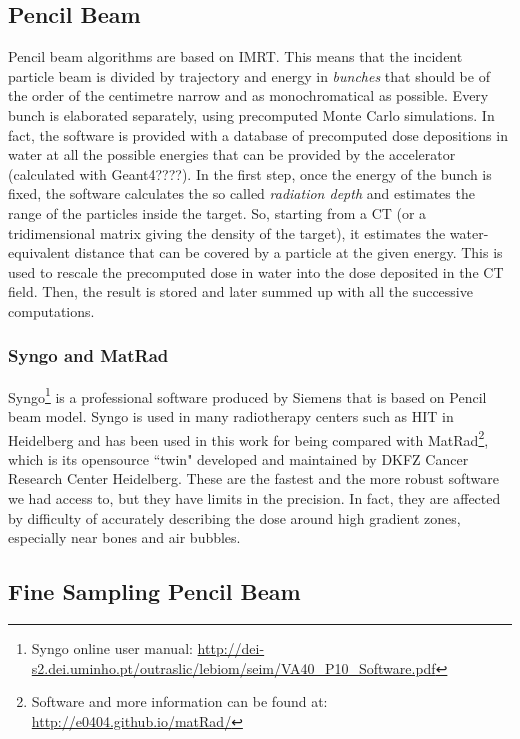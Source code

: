 \documentclass[12pt, a4paper, twoside]{book}
\begin{document}
\subsection{Pencil Beam} 
\label{sec:pen}
Pencil beam algorithms are based on IMRT. This means that the incident particle beam is divided by trajectory and energy in \emph{bunches} that should be of the order of the centimetre narrow and as monochromatical as possible. Every bunch is elaborated separately, using precomputed Monte Carlo simulations. In fact, the software is provided with a database of precomputed dose depositions in water at all the possible energies that can be provided by the accelerator (calculated with Geant4????). 
In the first step, once the energy of the bunch is fixed, the software calculates the so called \emph{radiation depth} and estimates the range of the particles inside the target. So, starting from a CT (or a tridimensional matrix giving the density of the target), it estimates the water-equivalent distance that can be covered by a particle at the given energy. 
This is used to rescale the precomputed dose in water into the dose deposited in the CT field. Then, the result is stored and later summed up with all the successive computations. 
\subsubsection{Syngo and MatRad}
Syngo\footnote{Syngo online user manual: \url{http://dei-s2.dei.uminho.pt/outraslic/lebiom/seim/VA40_P10_Software.pdf}} is a professional software produced by Siemens that is based on Pencil beam model. Syngo is used in many radiotherapy centers such as HIT in Heidelberg and has been used in this work for being compared with MatRad\footnote{Software and more information can be found at: \url{http://e0404.github.io/matRad/}}, which is its opensource ``twin" developed and maintained by DKFZ Cancer Research Center Heidelberg. 
These are the fastest and the more robust software we had access to, but they have limits in the precision. In fact, they are affected by difficulty of accurately describing the dose around high gradient zones, especially near bones and air bubbles.







\subsection{Fine Sampling Pencil Beam}
\end{document}
